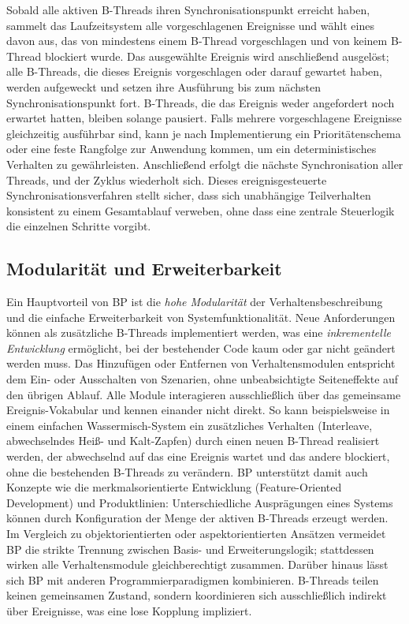 Sobald alle aktiven B-Threads ihren Synchronisationspunkt erreicht haben, sammelt das Laufzeitsystem alle vorgeschlagenen Ereignisse und wählt eines davon aus, das von mindestens einem B-Thread vorgeschlagen und von keinem B-Thread blockiert wurde\cite{Harel2012}.
Das ausgewählte Ereignis wird anschließend ausgelöst; alle B-Threads, die dieses Ereignis vorgeschlagen oder darauf gewartet haben, werden aufgeweckt und setzen ihre Ausführung bis zum nächsten Synchronisationspunkt fort\cite{Harel2012}.
B-Threads, die das Ereignis weder angefordert noch erwartet hatten, bleiben solange pausiert\cite{Harel2012}.
Falls mehrere vorgeschlagene Ereignisse gleichzeitig ausführbar sind, kann je nach Implementierung ein Prioritätenschema oder eine feste Rangfolge zur Anwendung kommen, um ein deterministisches Verhalten zu gewährleisten\cite{Harel2012}.
Anschließend erfolgt die nächste Synchronisation aller Threads, und der Zyklus wiederholt sich.
Dieses ereignisgesteuerte Synchronisationsverfahren stellt sicher, dass sich unabhängige Teilverhalten konsistent zu einem Gesamtablauf verweben, ohne dass eine zentrale Steuerlogik die einzelnen Schritte vorgibt.

\subsection{Modularität und Erweiterbarkeit}\label{subsec:modularitat-und-erweiterbarkeit}
Ein Hauptvorteil von BP ist die \emph{hohe Modularität} der Verhaltensbeschreibung und die einfache Erweiterbarkeit von Systemfunktionalität.
Neue Anforderungen können als zusätzliche B-Threads implementiert werden, was eine \emph{inkrementelle Entwicklung} ermöglicht, bei der bestehender Code kaum oder gar nicht geändert werden muss\cite{Harel2012}.
\newline
Das Hinzufügen oder Entfernen von Verhaltensmodulen entspricht dem Ein- oder Ausschalten von Szenarien, ohne unbeabsichtigte Seiteneffekte auf den übrigen Ablauf.
\newline
\newline
Alle Module interagieren ausschließlich über das gemeinsame Ereignis-Vokabular und kennen einander nicht direkt\cite{Harel2010}.
So kann beispielsweise in einem einfachen Wassermisch-System ein zusätzliches Verhalten (Interleave, abwechselndes Heiß- und Kalt-Zapfen) durch einen neuen B-Thread realisiert werden, der abwechselnd auf das eine Ereignis wartet und das andere blockiert, ohne die bestehenden B-Threads zu verändern\cite{Harel2012}.
\newline
\newline
BP unterstützt damit auch Konzepte wie die merkmalsorientierte Entwicklung (Feature-Oriented Development) und Produktlinien: Unterschiedliche Ausprägungen eines Systems können durch Konfiguration der Menge der aktiven B-Threads erzeugt werden\cite{Harel2012}.
Im Vergleich zu objektorientierten oder aspektorientierten Ansätzen vermeidet BP die strikte Trennung zwischen Basis- und Erweiterungslogik; stattdessen wirken alle Verhaltensmodule gleichberechtigt zusammen\cite{Harel2012}.
Darüber hinaus lässt sich BP mit anderen Programmierparadigmen kombinieren.
B-Threads teilen keinen gemeinsamen Zustand, sondern koordinieren sich ausschließlich indirekt über Ereignisse, was eine lose Kopplung impliziert\cite{Harel2012}.
